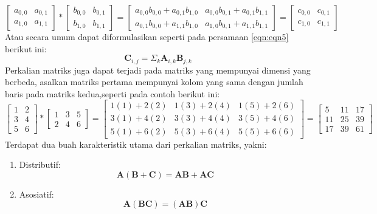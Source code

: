 \begin{dmath*}
    \begin{bmatrix}a_{0,0} & a_{0,1}\\ a_{1,0} & a_{1,1}\end{bmatrix} * \begin{bmatrix} b_{0,0} & b_{0,1}\\ b_{1,0} & b_{1,1}\end{bmatrix} =
    \begin{bmatrix}a_{0,0}b_{0,0} + a_{0,1}b_{1,0} & a_{0,0}b_{0,1} + a_{0,1}b_{1,1}\\a_{0,1}b_{0,0} + a_{1,1}b_{1,0} & a_{1,0}b_{0,1} + a_{1,1}b_{1,1} \end{bmatrix} =
    \begin{bmatrix} 
    c_{0,0} & c_{0,1}\\
    c_{1,0} & c_{1,1}
    \end{bmatrix}
\end{dmath*}
Atau secara umum dapat diformulasikan seperti pada persamaan \ref{eqn:eqn5} berikut ini:
\begin{dmath}\label{eqn:eqn5}
    \mathbf{C}_{i,j} = \Sigma_{k} \mathbf{A}_{i,k}\mathbf{B}_{j,k}
\end{dmath}
Perkalian matriks juga dapat terjadi pada matriks yang mempunyai dimensi yang berbeda, asalkan matriks pertama mempunyai kolom yang sama dengan jumlah baris pada matriks kedua,seperti pada contoh berikut ini:
\begin{dmath*}
    \begin{bmatrix}1 & 2\\3 & 4\\5 & 6\end{bmatrix} * \begin{bmatrix}1 & 3 & 5\\2 & 4 & 6\end{bmatrix} = \begin{bmatrix}1(1) + 2(2) & 1(3) + 2(4) & 1(5) + 2(6)\\3(1) + 4(2) & 3(3) + 4(4) & 3(5) + 4(6)\\ 5(1) + 6(2) & 5(3) + 6(4) & 5(5) + 6(6)\end{bmatrix} = \begin{bmatrix}5 & 11 & 17\\11 & 25 & 39\\17 & 39 & 61\end{bmatrix}
\end{dmath*}
Terdapat dua buah karakteristik utama dari perkalian matriks, yakni:
\begin{enumerate}
    \item Distributif: 
        \begin{equation} \label{eqn:eqn6}
            \mathbf{A}\left(\mathbf{B} + \mathbf{C}\right) = \mathbf{A}\mathbf{B} + \mathbf{A}\mathbf{C}
        \end{equation}
    \item Asosiatif: 
        \begin{equation}\label{eqn:eqn7}
            \mathbf{A}\left(\mathbf{B}\mathbf{C}\right) = \left(\mathbf{A}\mathbf{B}\right)\mathbf{C}
        \end{equation}
\end{enumerate}
